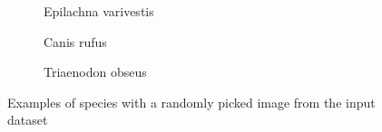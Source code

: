 \documentclass[times, utf8, diplomski]{fer}
\begin{document}
\begin{figure}
    
     \begin{subfigure}[b]{0.32\textwidth}
        \centering
        \caption{Epilachna varivestis}
        \label{fig:epilachna_varivestis}
    \end{subfigure}
        \begin{subfigure}[b]{0.32\textwidth}
        \centering
        \caption{Canis rufus}
        \label{fig:canis_rufus}
    \end{subfigure}
        \begin{subfigure}[b]{0.32\textwidth}
        \centering
        \caption{Triaenodon obseus}
        \label{fig:triaenodon_obseus}
    \end{subfigure}
    
\caption{Examples of species with a randomly picked image from the input dataset} 
\label{fig:specis_image_examples}
\end{figure}
\end{document}
